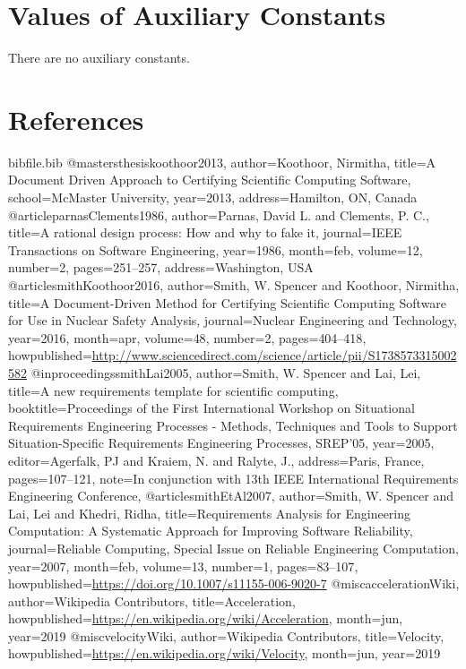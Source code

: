 \documentclass[12pt]{article}
\begin{document}
\section{Values of Auxiliary Constants}
\label{Sec:AuxConstants}
There are no auxiliary constants.

\section{References}
\label{Sec:References}
\begin{filecontents*}{bibfile.bib}
@mastersthesis{koothoor2013,
author={Koothoor, Nirmitha},
title={A Document Driven Approach to Certifying Scientific Computing Software},
school={McMaster University},
year={2013},
address={Hamilton, ON, Canada}}
@article{parnasClements1986,
author={Parnas, David L. and Clements, P. C.},
title={A rational design process: How and why to fake it},
journal={IEEE Transactions on Software Engineering},
year={1986},
month=feb,
volume={12},
number={2},
pages={251--257},
address={Washington, USA}}
@article{smithKoothoor2016,
author={Smith, W. Spencer and Koothoor, Nirmitha},
title={A Document-Driven Method for Certifying Scientific Computing Software for Use in Nuclear Safety Analysis},
journal={Nuclear Engineering and Technology},
year={2016},
month=apr,
volume={48},
number={2},
pages={404--418},
howpublished={\url{http://www.sciencedirect.com/science/article/pii/S1738573315002582}}}
@inproceedings{smithLai2005,
author={Smith, W. Spencer and Lai, Lei},
title={A new requirements template for scientific computing},
booktitle={Proceedings of the First International Workshop on Situational Requirements Engineering Processes - Methods, Techniques and Tools to Support Situation-Specific Requirements Engineering Processes, SREP'05},
year={2005},
editor={Agerfalk, PJ and Kraiem, N. and Ralyte, J.},
address={Paris, France},
pages={107--121},
note={In conjunction with 13th IEEE International Requirements Engineering Conference,}}
@article{smithEtAl2007,
author={Smith, W. Spencer and Lai, Lei and Khedri, Ridha},
title={Requirements Analysis for Engineering Computation: A Systematic Approach for Improving Software Reliability},
journal={Reliable Computing, Special Issue on Reliable Engineering Computation},
year={2007},
month=feb,
volume={13},
number={1},
pages={83--107},
howpublished={\url{https://doi.org/10.1007/s11155-006-9020-7}}}
@misc{accelerationWiki,
author={Wikipedia Contributors},
title={Acceleration},
howpublished={\url{https://en.wikipedia.org/wiki/Acceleration}},
month=jun,
year={2019}}
@misc{velocityWiki,
author={Wikipedia Contributors},
title={Velocity},
howpublished={\url{https://en.wikipedia.org/wiki/Velocity}},
month=jun,
year={2019}}
\end{filecontents*}
\nocite{*}
\printbibliography[heading=none]
\end{document}
